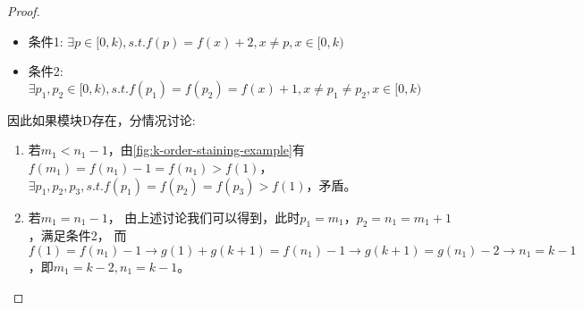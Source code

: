 \begin{proof}
    \begin{itemize}
        \item 条件1: $\exists p \in [0, k), s.t. f(p) = f(x) + 2, x \neq p , x \in [0, k)$
        \item 条件2: $\exists p_1, p_2 \in [0, k), s.t. f(p_1) = f(p_2) = f(x) + 1, x \neq p_1 \neq p_2, x \in [0, k)$
    \end{itemize}

    因此如果模块D存在，分情况讨论:

    \begin{enumerate}
        \item 若$m_1 < n_1 - 1$，由\ref{fig:k-order-staining-example}有$f(m_1) = f(n_1) - 1 = f(n_1) > f(1)$，$\exists p_1, p_2, p_3, s.t. f(p_1) = f(p_2) = f(p_3) > f(1)$，矛盾。
        \item 若$m_1 = n_1 - 1$， 由上述讨论我们可以得到，此时$p_1 = m_1$，$p_2 = n_1 = m_1 + 1$，满足条件2，
              而$f(1) = f(n_1) - 1 \rightarrow g(1) + g(k + 1) = f(n_1) - 1 \rightarrow g(k + 1) = g(n_1) - 2 \rightarrow n_1 = k - 1$，即$m_1 = k - 2, n_1 = k - 1$。


\end{enumerate}
\end{proof}
